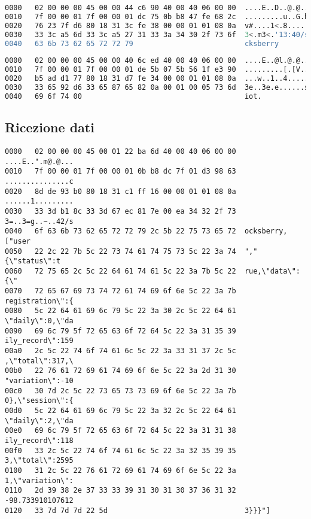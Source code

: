 \begin{lstlisting}[language=bash, label={lst:packetSottoscrizioneHttq}, captionpos=b, caption={HTTP Sottoscrizione al topic "socksberry"}, basicstyle=\scriptsize\ttfamily]
0000   02 00 00 00 45 00 00 44 c6 90 40 00 40 06 00 00  ....E..D..@.@...
0010   7f 00 00 01 7f 00 00 01 dc 75 0b b8 47 fe 68 2c  .........u..G.h,
0020   76 23 7f d6 80 18 31 3c fe 38 00 00 01 01 08 0a  v#....1<.8......
0030   33 3c a5 6d 33 3c a5 27 31 33 3a 34 30 2f 73 6f  3<.m3<.'13:40/so
0040   63 6b 73 62 65 72 72 79                          cksberry
\end{lstlisting}

\begin{lstlisting}[language=bash, label={lst:packetSottoscrizioneMqtt}, captionpos=b, caption={MQTT Sottoscrizione al topic "smiot"}, basicstyle=\scriptsize\ttfamily]
0000   02 00 00 00 45 00 00 40 6c ed 40 00 40 06 00 00  ....E..@l.@.@...
0010   7f 00 00 01 7f 00 00 01 de 5b 07 5b 56 1f e3 90  .........[.[V...
0020   b5 ad d1 77 80 18 31 d7 fe 34 00 00 01 01 08 0a  ...w..1..4......
0030   33 65 92 d6 33 65 87 65 82 0a 00 01 00 05 73 6d  3e..3e.e......sm
0040   69 6f 74 00                                      iot.
\end{lstlisting}

\subsection{Ricezione dati}
\label{app:packetRicezione}

\begin{lstlisting}[label={lst:packetRicezioneHttp}, captionpos=b, caption={HTTP Payload dati inviato dal server}, basicstyle=\scriptsize\ttfamily]
0000   02 00 00 00 45 00 01 22 ba 6d 40 00 40 06 00 00  ....E..".m@.@...
0010   7f 00 00 01 7f 00 00 01 0b b8 dc 7f 01 d3 98 63  ...............c
0020   8d de 93 b0 80 18 31 c1 ff 16 00 00 01 01 08 0a  ......1.........
0030   33 3d b1 8c 33 3d 67 ec 81 7e 00 ea 34 32 2f 73  3=..3=g..~..42/s
0040   6f 63 6b 73 62 65 72 72 79 2c 5b 22 75 73 65 72  ocksberry,["user
0050   22 2c 22 7b 5c 22 73 74 61 74 75 73 5c 22 3a 74  ","{\"status\":t
0060   72 75 65 2c 5c 22 64 61 74 61 5c 22 3a 7b 5c 22  rue,\"data\":{\"
0070   72 65 67 69 73 74 72 61 74 69 6f 6e 5c 22 3a 7b  registration\":{
0080   5c 22 64 61 69 6c 79 5c 22 3a 30 2c 5c 22 64 61  \"daily\":0,\"da
0090   69 6c 79 5f 72 65 63 6f 72 64 5c 22 3a 31 35 39  ily_record\":159
00a0   2c 5c 22 74 6f 74 61 6c 5c 22 3a 33 31 37 2c 5c  ,\"total\":317,\
00b0   22 76 61 72 69 61 74 69 6f 6e 5c 22 3a 2d 31 30  "variation\":-10
00c0   30 7d 2c 5c 22 73 65 73 73 69 6f 6e 5c 22 3a 7b  0},\"session\":{
00d0   5c 22 64 61 69 6c 79 5c 22 3a 32 2c 5c 22 64 61  \"daily\":2,\"da
00e0   69 6c 79 5f 72 65 63 6f 72 64 5c 22 3a 31 31 38  ily_record\":118
00f0   33 2c 5c 22 74 6f 74 61 6c 5c 22 3a 32 35 39 35  3,\"total\":2595
0100   31 2c 5c 22 76 61 72 69 61 74 69 6f 6e 5c 22 3a  1,\"variation\":
0110   2d 39 38 2e 37 33 33 39 31 30 31 30 37 36 31 32  -98.733910107612
0120   33 7d 7d 7d 22 5d                                3}}}"]
\end{lstlisting}

